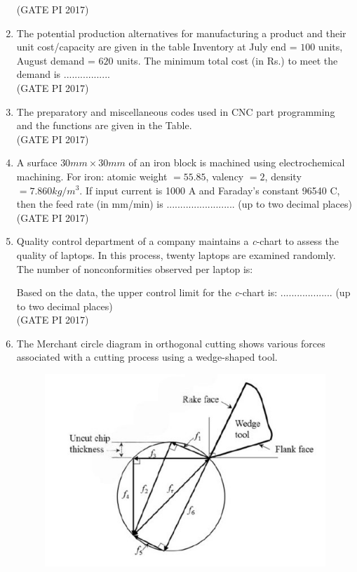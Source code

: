 \documentclass[journal,12pt,onecolumn]{IEEEtran}
\theoremstyle{remark}
\begin{document}
\begin{enumerate}

 
\hfill (GATE PI 2017)

\item The potential production alternatives for manufacturing a product and their unit cost/capacity are given in the table 
Inventory at July end = $100$ units, August demand = $620$ units.  
The minimum total cost (in Rs.) to meet the demand is .................\\



\hfill (GATE PI 2017)

\item The preparatory and miscellaneous codes used in CNC part programming and the functions are given in the Table. \\



\hfill (GATE PI 2017)

\item A surface $30 mm \times 30 mm$ of an iron block is machined using electrochemical machining.  
For iron: atomic weight $=55.85$, valency $= 2$, density $= 7.860 kg/m^3$.  
If input current is 1000 A and Faraday's constant 96540 C,  
then the feed rate (in mm/min) is ......................... (up to two decimal places)   \\

\hfill (GATE PI 2017)

\item Quality control department of a company maintains a \textit{c}-chart to assess the quality of laptops.  
In this process, twenty laptops are examined randomly. The number of nonconformities observed per laptop is: 



Based on the data, the upper control limit for the \textit{c}-chart is:  
................... (up to two decimal places) \\

\hfill (GATE PI 2017)

\item The Merchant circle diagram in orthogonal cutting shows various forces associated with a cutting process using a wedge\--shaped tool.  
 \\

\begin{figure}[h]
    \centering
    \includegraphics[width=0.5\columnwidth]{fig10.png}
    \caption{}
    \label{fig:placeholder}
\end{figure}


\end{enumerate}
\end{document}
